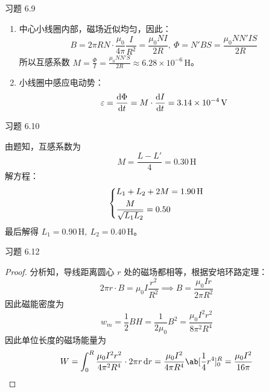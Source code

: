 \begin{problem}
	习题 6.9
	\begin{solution}
		\begin{enumerate}
			\item[\textbf{1)}] 中心小线圈内部，磁场近似均匀，因此：
			$$
			B = 2\pi R N \cdot \frac{\mu_0}{4 \pi} \frac{I}{R^2} = \frac{\mu_0 N I}{2 R},\ \Phi = N' B S = \frac{\mu_0 N N' I S}{2 R}
			$$
			所以互感系数 $M = \frac{\Phi}{I} = \frac{\mu_0 N N' S}{2 R} \approx 6.28 \times 10^{-6}\,\mathrm{H}$。

			\item[\textbf{2)}] 小线圈中感应电动势：
			$$
			\varepsilon = \dv{\Phi}{t} = M \cdot \dv{I}{t} = 3.14 \times 10^{-4} \,\mathrm{V}
			$$
		\end{enumerate}
	\end{solution}
\end{problem}

\begin{problem}
	习题 6.10
	\begin{solution}
		由题知，互感系数为
		$$
		M = \frac{L - L'}{4} = 0.30 \,\mathrm{H}
		$$
		解方程：
		$$
		\begin{dcases}
			L_1 + L_2 + 2 M = 1.90 \,\mathrm{H} \\
			\frac{M}{\sqrt{L_1 L_2}} = 0.50
		\end{dcases}
		$$
		最后解得 $L_1 = 0.90\,\mathrm{H},\ L_2 = 0.40\,\mathrm{H}$。
	\end{solution}
\end{problem}

\begin{problem}
	习题 6.12
	\begin{proof}
		分析知，导线距离圆心 $r$ 处的磁场都相等，根据安培环路定理：
		$$
		2\pi r \cdot B = \mu_0 I \frac{r^2}{R^2} \implies B = \frac{\mu_0 I r}{2 \pi R^2}
		$$
		因此磁能密度为
		$$
		w_m = \frac{1}{2} B H = \frac{1}{2 \mu_0} B^2 = \frac{\mu_0 I^2 r^2}{8 \pi^2 R^4}
		$$
		因此单位长度的磁场能量为
		$$
		W = \int_{0}^{R} \frac{\mu_0 I^2 r^2}{4 \pi^2 R^4} \cdot 2 \pi r \dd{r} = \frac{\mu_0 I^2}{4 \pi R^{4}} \ab[\frac{1}{4} r^{4}]_{0}^{R} = \frac{\mu_0 I^2}{16 \pi}
		$$
	\end{proof}
\end{problem}

